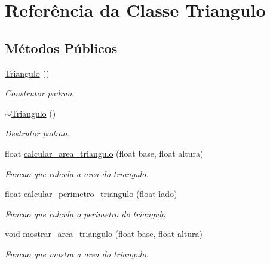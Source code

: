 \hypertarget{classTriangulo}{}\section{Referência da Classe Triangulo}
\label{classTriangulo}
\subsection*{Métodos Públicos}
\begin{DoxyCompactItemize}
\item 
\mbox{\label{classTriangulo_a905d421bd19655a979ccad9e2998db0c}} 
\hyperlink{classTriangulo_a905d421bd19655a979ccad9e2998db0c}{Triangulo} ()
\begin{DoxyCompactList}\small\item\em Construtor padrao. \end{DoxyCompactList}\item 
\mbox{\label{classTriangulo_aca2be15b19831e8d7a5331808f5c1958}} 
\hyperlink{classTriangulo_aca2be15b19831e8d7a5331808f5c1958}{$\sim$\+Triangulo} ()
\begin{DoxyCompactList}\small\item\em Destrutor padrao. \end{DoxyCompactList}\item 
float \hyperlink{classTriangulo_a4c849485ba611cfeadc46030687bf74f}{calcular\+\_\+area\+\_\+triangulo} (float base, float altura)
\begin{DoxyCompactList}\small\item\em Funcao que calcula a area do triangulo. \end{DoxyCompactList}\item 
float \hyperlink{classTriangulo_a95408e4018c121b3ef88b3c44a4e3607}{calcular\+\_\+perimetro\+\_\+triangulo} (float lado)
\begin{DoxyCompactList}\small\item\em Funcao que calcula o perimetro do triangulo. \end{DoxyCompactList}\item 
void \hyperlink{classTriangulo_a82082d7842eb3b9968b6a36d2eb99684}{mostrar\+\_\+area\+\_\+triangulo} (float base, float altura)
\begin{DoxyCompactList}\small\item\em Funcao que mostra a area do triangulo. \end{DoxyCompactList}\item 

\end{DoxyCompactItemize}
